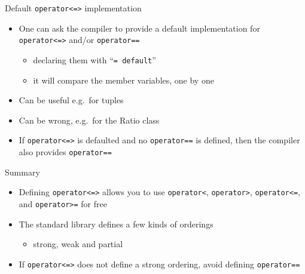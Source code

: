 \begin{frame}[fragile]
  \begin{block}{Default \texttt{operator<=>} implementation}
    \begin{itemize}
    \item One can ask the compiler to provide a default implementation for \texttt{operator<=>} and/or \texttt{operator==}
      \begin{itemize}
        \item declaring them with ``\texttt{= default}''
        \item it will compare the member variables, one by one
      \end{itemize}
    \item Can be useful e.g.\ for tuples
    \item Can be wrong, e.g.\ for the Ratio class
    \item If \texttt{operator<=>} is defaulted and no \texttt{operator==} is defined, then the compiler also provides \texttt{operator==}
    \end{itemize}
  \end{block}
\end{frame}

\begin{frame}[fragile]
  \begin{block}{Summary}
    \begin{itemize}
      \item Defining \texttt{operator<=>} allows you to use \texttt{operator<}, \texttt{operator>}, \texttt{operator<=}, and \texttt{operator>=} for free
      \item The standard library defines a few kinds of orderings
        \begin{itemize}
          \item strong, weak and partial
        \end{itemize}
      \item If \texttt{operator<=>} does not define a strong ordering, avoid defining \texttt{operator==}
    \end{itemize}
  \end{block}
\end{frame}
